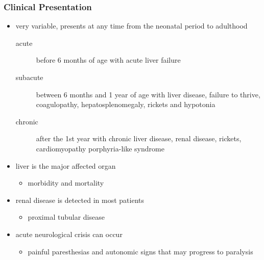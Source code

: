 \documentclass{scrartcl}
\begin{document}
\subsubsection{Clinical Presentation}
\label{sec:org5446437}
\begin{itemize}
\item very variable, presents at any time from the neonatal period to adulthood
\begin{description}
\item[{acute}] before 6 months of age with acute liver failure
\item[{subacute}] between 6 months and 1 year of age with liver disease,
failure to thrive, coagulopathy, hepatosplenomegaly,
rickets and hypotonia
\item[{chronic}] after the 1st year with chronic liver disease, renal
disease, rickets, cardiomyopathy \textpm{} porphyria-like
syndrome
\end{description}

\item liver is the major affected organ
\begin{itemize}
\item morbidity and mortality
\end{itemize}
\item renal disease is detected in most patients
\begin{itemize}
\item proximal tubular disease
\end{itemize}
\item acute neurological crisis can occur
\begin{itemize}
\item painful paresthesias and autonomic signs that may progress to
paralysis
\end{itemize}
\end{itemize}
\end{document}
